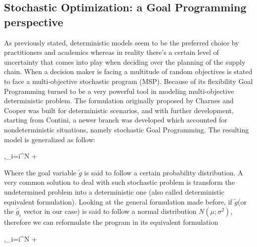 \begin{doublespace}
  \subsection{Stochastic Optimization: a Goal Programming perspective}
 As previously stated, deterministic models seem to be the preferred choice by practitioners and academics whereas in reality there's a certain level of uncertainty that comes into play when deciding over the planning of the supply chain. When a decision maker is facing a multitude of random objectives is stated to face a multi-objective stochastic program (MSP). Because of its flexibility Goal Programming turned to be a very powerful tool in modeling multi-objective deterministic problem. The formulation originally proposed by Charnes and Cooper\cite{Charnes1955} was built for deterministic scenarios, and with further development, starting from Contini\cite{Contini1968}, a newer branch was developed which accounted for nondeterministic situations, namely stochastic Goal Programming. The resulting model is generalized as follow:
\begin{mini!}
	{\tilde{\delta^+},\tilde{\delta^-}}{\sum_{i=i}^{N} +}{}{}
\end{mini!}
Where the goal variable $\tilde{g}$ is said to follow a certain probability distribution. A very common solution to deal with such stochastic problem is transform the undetermined problem into a deterministic one (also called deterministic equivalent formulation). Looking at the general formulation made before, if $\tilde{g}$(or the $\tilde{g_i}$ vector in our case) is said to follow a normal distribution $N(\mu;\sigma^2)$, therefore we can reformulate the program in its equivalent formulation\cite{Azimian2017}
\begin{mini!}
	{\tilde{\delta^+},\tilde{\delta^-}}{\sum_{i=i}^{N} +}{}{}
\end{mini!}


\end{doublespace}
